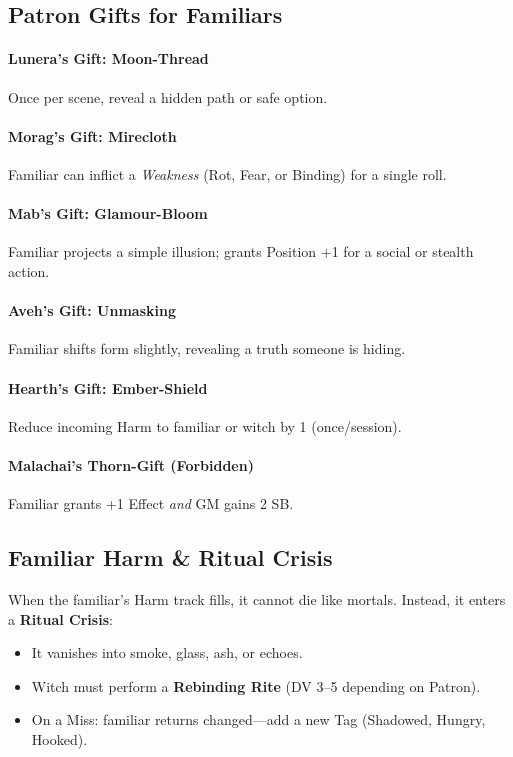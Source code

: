 \documentclass[11pt]{book}
\begin{document}
\subsection{Patron Gifts for Familiars}

\paragraph{Lunera's Gift: Moon-Thread}  
Once per scene, reveal a hidden path or safe option.

\paragraph{Morag's Gift: Mirecloth}  
Familiar can inflict a \emph{Weakness} (Rot, Fear, or Binding) for a single roll.

\paragraph{Mab's Gift: Glamour-Bloom}  
Familiar projects a simple illusion; grants Position +1 for a social or stealth action.

\paragraph{Aveh's Gift: Unmasking}  
Familiar shifts form slightly, revealing a truth someone is hiding.

\paragraph{Hearth's Gift: Ember-Shield}  
Reduce incoming Harm to familiar or witch by 1 (once/session).

\paragraph{Malachai's Thorn-Gift (Forbidden)}  
Familiar grants +1 Effect \emph{and} GM gains 2 SB.

\subsection{Familiar Harm \& Ritual Crisis}

When the familiar's Harm track fills, it cannot die like mortals.  
Instead, it enters a \textbf{Ritual Crisis}:

\begin{itemize}[leftmargin=1.5em]
    \item It vanishes into smoke, glass, ash, or echoes.
    \item Witch must perform a \textbf{Rebinding Rite} (DV 3--5 depending on Patron).
    \item On a Miss: familiar returns changed---add a new Tag (Shadowed, Hungry, Hooked).
\end{itemize}
\end{document}
